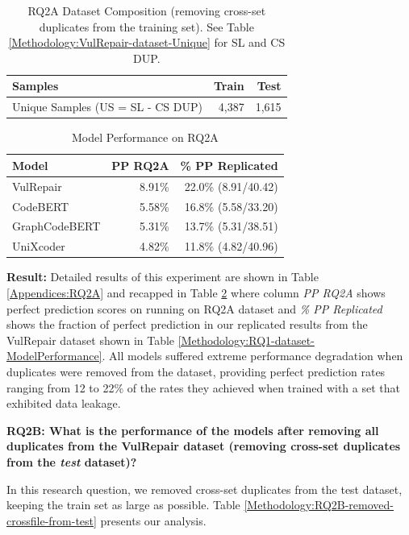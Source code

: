\begin{table}[h]
\centering
 \caption{RQ2A Dataset Composition (removing cross-set duplicates from the training set). See Table \ref{Methodology:VulRepair-dataset-Unique} for SL and CS DUP.}
 \label{Methodology:RQ2-removed-crossfile-from-train}
 \begin{tabular}{|l|r|r|}
   \hline
   Samples &Train &Test\\
   \hline
   Unique Samples (US = SL - CS DUP)                    &4,387   &1,615\\
 \hline
\end{tabular}
\end{table}



\begin{table}[h]
\centering
  \caption{Model Performance on RQ2A}
  \label{Methodology:RQ2A-dataset-ModelPerformance}
  \begin{tabular}{|l|r|r|}
    \hline
    Model           & PP RQ2A & \% PP Replicated\\
    \hline
    VulRepair       & 8.91\% & 22.0\% (8.91/40.42)\\
    \hline
    CodeBERT        & 5.58\% & 16.8\% (5.58/33.20)\\
    \hline
    GraphCodeBERT   & 5.31\% & 13.7\% (5.31/38.51)\\
    \hline
    UniXcoder       & 4.82\% & 11.8\% (4.82/40.96)\\
  \hline
\end{tabular}
\end{table}


\textbf{Result:} Detailed results of this experiment are shown in Table \ref{Appendices:RQ2A} and recapped in Table \ref{Methodology:RQ2A-dataset-ModelPerformance} where column \emph{PP RQ2A} shows perfect prediction scores on running on RQ2A dataset and \emph{\% PP Replicated} shows the fraction of perfect prediction in our replicated results from the VulRepair dataset shown in Table \ref{Methodology:RQ1-dataset-ModelPerformance}.
All models suffered extreme performance degradation when duplicates were removed from the dataset, providing perfect prediction rates ranging from 12 to 22\% of the rates they achieved when trained with a set that exhibited data leakage.  

\textbf{RQ2B: What is the performance of the models after removing all duplicates from the VulRepair dataset (removing cross-set duplicates from the \emph{test} dataset)?}

In this research question, we removed cross-set duplicates from the test dataset, keeping the train set as large as possible. Table \ref{Methodology:RQ2B-removed-crossfile-from-test} presents our analysis.



